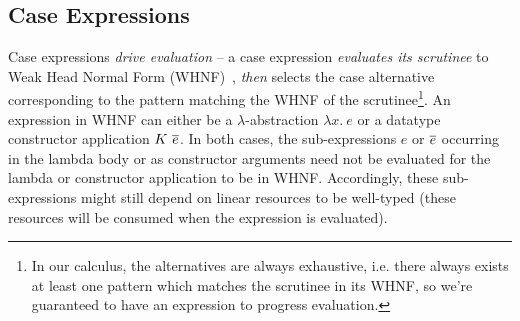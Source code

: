 \documentclass[acmsmall,review,anonymous]{acmart}
\begin{document}

\subsection{Case Expressions\label{sec:lc-case-exps}}

Case expressions \emph{drive evaluation} --
%
%
%
a case expression \emph{evaluates its scrutinee} to Weak Head Normal
Form (WHNF)~\cite{10.5555/1096899}, \emph{then} selects the case
alternative corresponding to the pattern matching the WHNF of the
scrutinee\footnote{In our calculus, the alternatives are always
  exhaustive, i.e. there always exists at least one pattern which
  matches the scrutinee in its WHNF, so we're guaranteed to have an
  expression to progress evaluation.}. An expression in WHNF can either be %
a $\lambda$-abstraction $\lambda x.~e$ 
or a datatype constructor application $K~\overline{e}$.
In both cases, the sub-expressions $e$ or $\overline{e}$ occurring in the lambda body
or as constructor arguments need not be evaluated for the lambda or constructor
application to be in WHNF. %
%
Accordingly, these sub-expressions might still depend on linear resources to be
well-typed (these resources will be consumed when the expression is evaluated).
\end{document}
